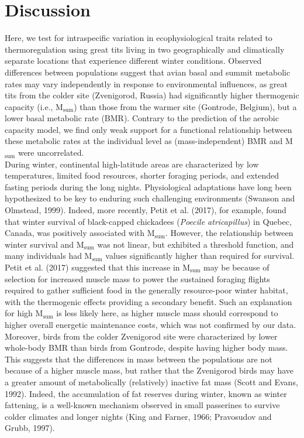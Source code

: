 \documentclass[10pt, twoside]{book} %
\begin{document}
\section{Discussion}
Here, we test for intraspecific variation in ecophysiological traits related to thermoregulation using great tits living in two geographically and climatically separate locations that experience different winter conditions. Observed differences between populations suggest that avian basal and summit metabolic rates may vary independently in response to environmental influences, as great tits from the colder site (Zvenigorod, Russia) had significantly higher thermogenic capacity (i.e., M$_{\text{sum}}$) than those from the warmer site (Gontrode, Belgium), but a lower basal metabolic rate (BMR). Contrary to the prediction of the aerobic capacity model, we find only weak support for a functional relationship between these metabolic rates at the individual level as (mass-independent) BMR and M$_{\text{sum}}$ were uncorrelated. \\

During winter, continental high-latitude areas are characterized by low temperatures, limited food resources, shorter foraging periods, and extended fasting periods during the long nights. Physiological adaptations have long been hypothesized to be key to enduring such challenging environments (Swanson and Olmstead, 1999). Indeed, more recently, Petit et al. (2017), for example, found that winter survival of black-capped chickadees (\textit{Poecile atricapillus}) in Quebec, Canada, was positively associated with M$_{\text{sum}}$. However, the relationship between winter survival and M$_{\text{sum}}$ was not linear, but exhibited a threshold function, and many individuals had M$_{\text{sum}}$ values significantly higher than required for survival. Petit et al. (2017) suggested that this increase in M$_{\text{sum}}$ may be because of selection for increased muscle mass to power the sustained foraging flights required to gather sufficient food in the generally resource-poor winter habitat, with the thermogenic effects providing a secondary benefit. Such an explanation for high M$_{\text{sum}}$ is less likely here, as higher muscle mass should correspond to higher overall energetic maintenance costs, which was not confirmed by our data. Moreover, birds from the colder Zvenigorod site were characterized by lower whole-body BMR than birds from Gontrode, despite having higher body mass. This suggests that the differences in mass between the populations are not because of a higher muscle mass, but rather that the Zvenigorod birds may have a greater amount of metabolically (relatively) inactive fat mass (Scott and Evans, 1992). Indeed, the accumulation of fat reserves during winter, known as winter fattening, is a well-known mechanism observed in small passerines to survive colder climates and longer nights (King and Farner, 1966; Pravosudov and Grubb, 1997).\\ 
\end{document}
